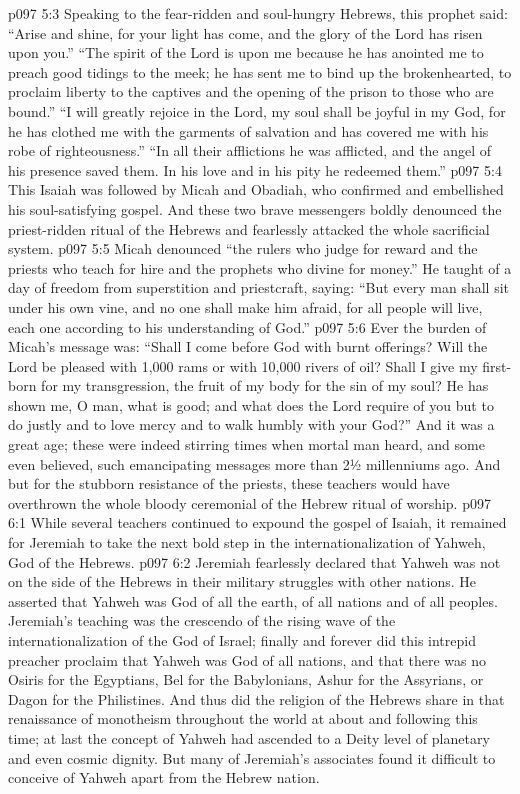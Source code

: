 \vs p097 5:3 Speaking to the fear\hyp{}ridden and soul\hyp{}hungry Hebrews, this prophet said: “Arise and shine, for your light has come, and the glory of the Lord has risen upon you.” “The spirit of the Lord is upon me because he has anointed me to preach good tidings to the meek; he has sent me to bind up the brokenhearted, to proclaim liberty to the captives and the opening of the prison to those who are bound.” “I will greatly rejoice in the Lord, my soul shall be joyful in my God, for he has clothed me with the garments of salvation and has covered me with his robe of righteousness.” “In all their afflictions he was afflicted, and the angel of his presence saved them. In his love and in his pity he redeemed them.”
\vs p097 5:4 \pc This Isaiah was followed by Micah and Obadiah, who confirmed and embellished his soul\hyp{}satisfying gospel. And these two brave messengers boldly denounced the priest\hyp{}ridden ritual of the Hebrews and fearlessly attacked the whole sacrificial system.
\vs p097 5:5 Micah denounced “the rulers who judge for reward and the priests who teach for hire and the prophets who divine for money.” He taught of a day of freedom from superstition and priestcraft, saying: “But every man shall sit under his own vine, and no one shall make him afraid, for all people will live, each one according to his understanding of God.”
\vs p097 5:6 Ever the burden of Micah’s message was: “Shall I come before God with burnt offerings? Will the Lord be pleased with 1,000 rams or with 10,000 rivers of oil? Shall I give my first\hyp{}born for my transgression, the fruit of my body for the sin of my soul? He has shown me, O man, what is good; and what does the Lord require of you but to do justly and to love mercy and to walk humbly with your God?” And it was a great age; these were indeed stirring times when mortal man heard, and some even believed, such emancipating messages more than 2½ millenniums ago. And but for the stubborn resistance of the priests, these teachers would have overthrown the whole bloody ceremonial of the Hebrew ritual of worship.
\vs p097 6:1 While several teachers continued to expound the gospel of Isaiah, it remained for Jeremiah to take the next bold step in the internationalization of Yahweh, God of the Hebrews.
\vs p097 6:2 Jeremiah fearlessly declared that Yahweh was not on the side of the Hebrews in their military struggles with other nations. He asserted that Yahweh was God of all the earth, of all nations and of all peoples. Jeremiah’s teaching was the crescendo of the rising wave of the internationalization of the God of Israel; finally and forever did this intrepid preacher proclaim that Yahweh was God of all nations, and that there was no Osiris for the Egyptians, Bel for the Babylonians, Ashur for the Assyrians, or Dagon for the Philistines. And thus did the religion of the Hebrews share in that renaissance of monotheism throughout the world at about and following this time; at last the concept of Yahweh had ascended to a Deity level of planetary and even cosmic dignity. But many of Jeremiah’s associates found it difficult to conceive of Yahweh apart from the Hebrew nation.
